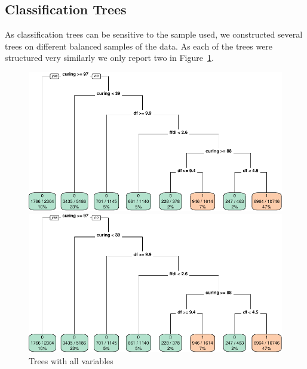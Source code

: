 \documentclass[11pt,a4paper]{article}
\begin{document}


\subsection{Classification Trees}

As classification trees can be sensitive to the sample used, we constructed several trees on different balanced samples of the data. As each of the trees were structured very similarly we only report two in Figure~\ref{fig:tree2}.

\begin{figure}
  \centering
	\includegraphics[page=1, width=\textwidth]{figures/trees2.pdf}\par\vspace*{1.5cm}\par
	\includegraphics[page=2, width=\textwidth]{figures/trees2.pdf}
  \caption{Trees with all variables}
  \label{fig:tree2}
\end{figure}
\end{document}
